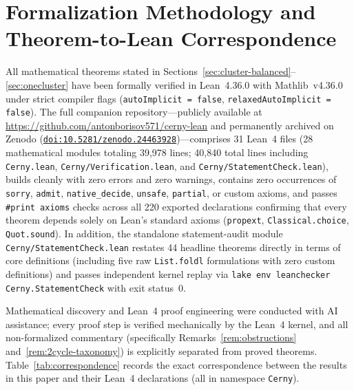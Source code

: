 \documentclass[11pt,a4paper]{article}
\theoremstyle{definition}
\theoremstyle{remark}
\begin{document}
\section{Formalization Methodology and Theorem-to-Lean Correspondence}
\label{sec:formalization}

All mathematical theorems stated in Sections~\ref{sec:cluster-balanced}--\ref{sec:onecluster} have been formally verified in Lean~4.36.0 with Mathlib~v4.36.0 under strict compiler flags (\texttt{autoImplicit = false}, \texttt{relaxedAutoImplicit = false}). The full companion repository---publicly available at \url{https://github.com/antonborisov571/cerny-lean} and permanently archived on Zenodo (\href{https://doi.org/10.5281/zenodo.24463928}{\texttt{doi:10.5281/zenodo.24463928}})---comprises 31 Lean~4 files (28 mathematical modules totaling 39{,}978 lines; 40{,}840 total lines including \texttt{Cerny.lean}, \texttt{Cerny/Verification.lean}, and \texttt{Cerny/StatementCheck.lean}), builds cleanly with zero errors and zero warnings, contains zero occurrences of \texttt{sorry}, \texttt{admit}, \texttt{native\_decide}, \texttt{unsafe}, \texttt{partial}, or custom axioms, and passes \texttt{\#print axioms} checks across all 220 exported declarations confirming that every theorem depends solely on Lean's standard axioms (\texttt{propext}, \texttt{Classical.choice}, \texttt{Quot.sound}). In addition, the standalone statement-audit module \texttt{Cerny/StatementCheck.lean} restates 44 headline theorems directly in terms of core definitions (including five raw \texttt{List.foldl} formulations with zero custom definitions) and passes independent kernel replay via \texttt{lake env leanchecker Cerny.StatementCheck} with exit status~0.

Mathematical discovery and Lean~4 proof engineering were conducted with AI assistance; every proof step is verified mechanically by the Lean~4 kernel, and all non-formalized commentary (specifically Remarks~\ref{rem:obstructions} and~\ref{rem:2cycle-taxonomy}) is explicitly separated from proved theorems. Table~\ref{tab:correspondence} records the exact correspondence between the results in this paper and their Lean~4 declarations (all in namespace \texttt{Cerny}).
\end{document}
